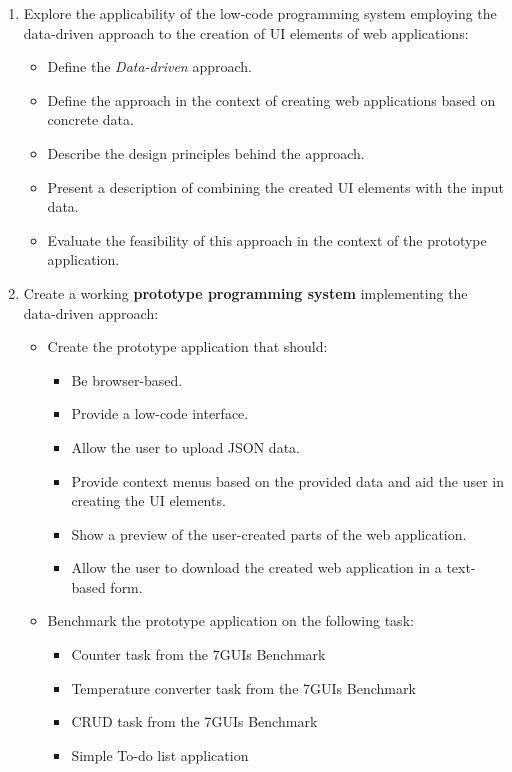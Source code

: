 \begin{enumerate}
	\item Explore the applicability of the low-code programming system employing the data-driven approach to the creation of UI elements of web applications:
	      \begin{itemize}
		      \item Define the \emph{Data-driven} approach.
		      \item Define the approach in the context of creating web applications based on concrete data.
		      \item Describe the design principles behind the approach.
		      \item Present a description of combining the created UI elements with the input data.
		      \item Evaluate the feasibility of this approach in the context of the prototype application.
	      \end{itemize}
	\item Create a working \textbf{prototype programming system} implementing the data-driven approach:
	      \begin{itemize}
		      \item Create the prototype application that should:
		            \begin{itemize}
			            \item Be browser-based.
			            \item Provide a low-code interface.
			            \item Allow the user to upload JSON data.
			            \item Provide context menus based on the provided data and aid the user in creating the UI elements.
			            \item Show a preview of the user-created parts of the web application.
			            \item Allow the user to download the created web application in a text-based form.
		            \end{itemize}

		      \item Benchmark the prototype application on the following task:
		            \begin{itemize}
			            \item Counter task from the 7GUIs Benchmark
			            \item Temperature converter task from the 7GUIs Benchmark
			            \item CRUD task from the 7GUIs Benchmark
			            \item Simple To-do list application
		            \end{itemize}
	      \end{itemize}
\end{enumerate}


